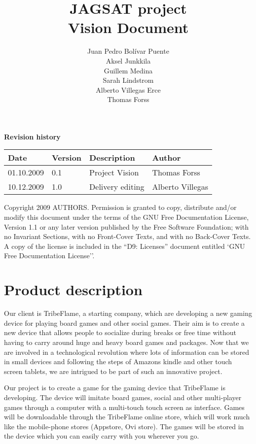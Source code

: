 \documentclass[12pt,a4paper]{article}
\title{\large JAGSAT project\\\huge Vision Document}
\author{
  Juan Pedro Bolívar Puente\\ 
  Aksel Junkkila\\
  Guillem Medina\\ 
  Sarah Lindstrom\\ 
  Alberto Villegas Erce\\ 
  Thomas Forss
}
\begin{document}
\maketitle

\begin{center}
\textbf{Revision history}

\begin{tabular}{ l | l | l | l }
Date			&Version	&Description		&Author\\\hline\hline
01.10.2009	&0.1		&Project Vision		&Thomas Forss\\
10.12.2009	&1.0		&Delivery editing	&Alberto Villegas 
\end{tabular}
\label{tab:rev}
\end{center}

\vfill
Copyright 2009 AUTHORS.
Permission is granted to copy, distribute and/or modify this document under the terms of the GNU Free Documentation License, Version 1.1 or any later version published by the Free Software Foundation;  with no Invariant Sections, with no Front-Cover Texts, and with no Back-Cover Texts. A copy of the license is included in the ``D9: Licenses''  document entitled `GNU Free Documentation License''.

\pagebreak
\tableofcontents
\pagebreak

\disabletodo

\section{Product description}

Our client is TribeFlame, a starting company, which are developing a
new gaming device for playing board games and other social
games. Their aim is to create a new device that allows people to
socialize during breaks or free time without having to carry around
huge and heavy board games and packages. Now that we are involved in a
technological revolution where lots of information can be stored in
small devices and following the steps of Amazons kindle and other
touch screen tablets, we are intrigued to be part of such an
innovative project.

Our project is to create a game for the gaming device that TribeFlame
is developing. The device will imitate board games, social and other
multi-player games through a computer with a multi-touch touch screen
as interface. Games will be downloadable through the TribeFlame online
store, which will work much like the mobile-phone stores (Appstore,
Ovi store). The games will be stored in the device which you can
easily carry with you wherever you go.
\end{document}
